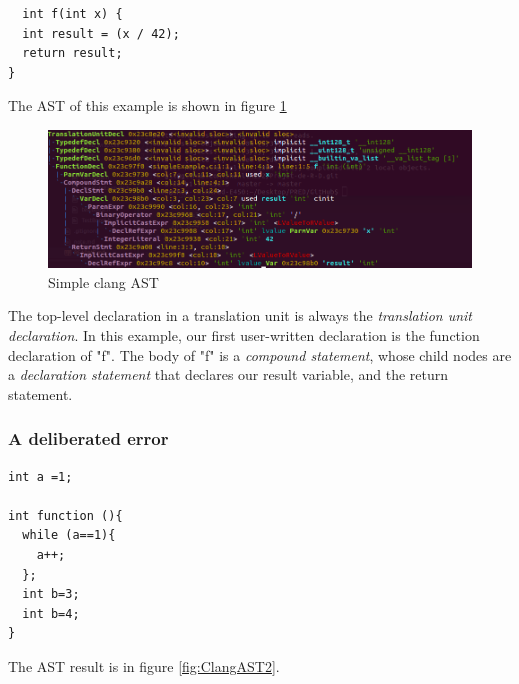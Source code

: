         \begin{lstlisting}
  int f(int x) {
  int result = (x / 42);
  return result;
}
        \end{lstlisting}     
  
The AST of this example is shown in figure \ref{fig:ClangAST1}        
        
    \begin{figure}
        \centering
        \includegraphics[scale = 0.5]
        {Images/experiments/clangAST1.png}
        \caption[Simple clang AST]%
{Simple clang AST}
        \label{fig:ClangAST1}
    \end{figure}
    
    The top-level declaration in a translation unit is always the \textit{translation unit declaration}. In this example, our first user-written declaration is the function declaration of "f". The body of "f" is a \textit{compound statement}, whose child nodes are a \textit{declaration statement} that declares our result variable, and the return statement.
    
\subsubsection{A deliberated error}
\begin{lstlisting}
int a =1;

int function (){
  while (a==1){
    a++;
  };
  int b=3;
  int b=4;
}
 \end{lstlisting}     
  
 The AST result is in figure \ref{fig:ClangAST2}.
 
